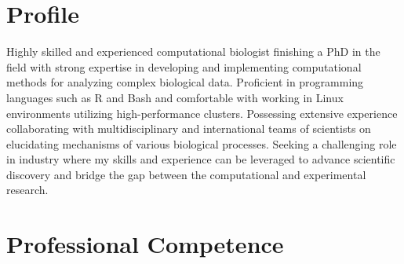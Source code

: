 \documentclass[11pt,a4paper,]{awesome-cv}
\begin{document}
\makecvheader






\hypertarget{profile}{%
\section{Profile}\label{profile}}

Highly skilled and experienced computational biologist finishing a PhD
in the field with strong expertise in developing and implementing
computational methods for analyzing complex biological data. Proficient
in programming languages such as R and Bash and comfortable with working
in Linux environments utilizing high-performance clusters. Possessing
extensive experience collaborating with multidisciplinary and
international teams of scientists on elucidating mechanisms of various
biological processes. Seeking a challenging role in industry where my
skills and experience can be leveraged to advance scientific discovery
and bridge the gap between the computational and experimental research.

\hypertarget{professional-competence}{%
\section{Professional Competence}\label{professional-competence}}
\end{document}
